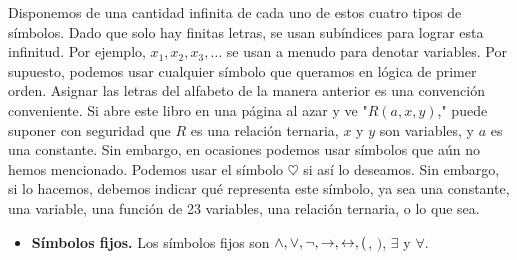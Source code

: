 \message{ !name(main.tex)}\documentclass[12pt,a4paper]{book}
\newcommand{\comillas}[1]{"#1"}
\begin{document}
    Disponemos de una cantidad infinita de cada uno de estos cuatro tipos de símbolos. Dado que solo hay finitas letras, se
    usan subíndices para lograr esta infinitud. Por ejemplo, $x_{1},x_{2},x_{3},\dots$ se usan a menudo para denotar
    variables. Por supuesto, podemos usar cualquier símbolo que queramos en lógica de primer orden. Asignar las letras del
    alfabeto de la manera anterior es una convención conveniente. Si abre este libro en una página al azar y ve
    \comillas{$R(a,x,y)$,} puede suponer con seguridad que $R$ es una relación ternaria, $x$ y $y$ son variables, y $a$ es una
    constante. Sin embargo, en ocasiones podemos usar símbolos que aún no hemos mencionado. Podemos usar el símbolo $\heartsuit$
    si así lo deseamos. Sin embargo, si lo hacemos, debemos indicar qué representa este símbolo, ya sea una constante, una
    variable, una función de 23 variables, una relación ternaria, o lo que sea.

    \begin{itemize}
        \item[$\bullet$] \textbf{Símbolos fijos.} Los símbolos fijos son $\wedge,\vee,\neg,\rightarrow,\leftrightarrow,($, $)$,
        $\exists$ y $\forall$.
    \end{itemize}
\end{document}
